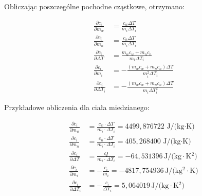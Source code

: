 \documentclass[a4paper,12pt]{article}
\begin{document}
Obliczając poszczególne pochodne cząstkowe, otrzymano:

\begin{align*}
    \frac{\partial c_i}{\partial m_{w}}      & = \frac{c_{w} \Delta T}{m_i \Delta T_i}                         \\
    \frac{\partial c_i}{\partial m_{n}}      & = \frac{c_{n} \Delta T}{m_i \Delta T_i}                         \\
    \frac{\partial c_i}{\partial \Delta T}   & = \frac{m_{w} c_{w} + m_{n} c_{n}}{m_i \Delta T_i}              \\
    \frac{\partial c_i}{\partial m_i}        & = -\frac{(m_{w} c_{w} + m_{n} c_{n})\Delta T}{m_i^2 \Delta T_i} \\
    \frac{\partial c_i}{\partial \Delta T_i} & = -\frac{(m_{w} c_{w} + m_{n} c_{n})\Delta T}{m_i\Delta T_i^2}
\end{align*}

Przykładowe obliczenia dla ciała miedzianego:


\begin{align*}
    \frac{\partial c_i}{\partial m_w}        & = \frac{c_w \cdot \Delta T}{m_i \cdot \Delta T_i} = 4499{,}876722\,\text{J/(kg$\cdot$K)} \\
    \frac{\partial c_i}{\partial m_n}        & = \frac{c_n \cdot \Delta T}{m_i \cdot \Delta T_i} = 405{,}268400\,\text{J/(kg$\cdot$K)}  \\
    \frac{\partial c_i}{\partial \Delta T}   & = \frac{Q}{m_i \cdot \Delta T_i} = -64{,}531396\,\text{J/(kg$\cdot$K$^2$)}               \\
    \frac{\partial c_i}{\partial m_i}        & = -\frac{c_i}{m_i} = -4817{,}754936\,\text{J/(kg$^2\cdot$K)}                             \\
    \frac{\partial c_i}{\partial \Delta T_i} & = -\frac{c_i}{\Delta T_i} = 5{,}064019\,\text{J/(kg$\cdot$K$^2$)}
\end{align*}
\end{document}
